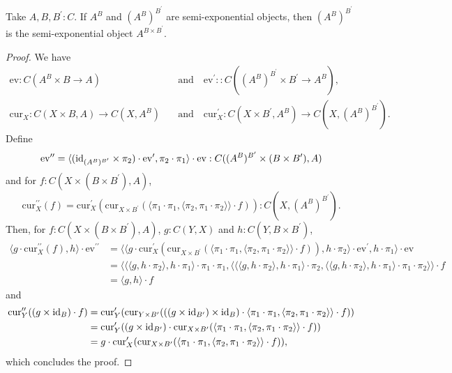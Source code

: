 \begin{lemma}
  Take $ A, B, B^\prime : C $. If $ A^B $ and $ (A^B)^{B^\prime} $ are semi-exponential objects, then $ (A^B)^{B^\prime} $ is the semi-exponential object $ A^{B \times B^\prime} $.
\end{lemma}
\begin{proof}
  We have
  \begin{align*}
    \mathrm{ev} : C(A^B \times B \to A) \quad &\text{and} \quad \mathrm{ev}^\prime : : C((A^B)^{B^\prime} \times B^\prime \to A^B),\\
    \mathrm{cur}_X: C(X \times B, A) \to C(X, A^B) \quad &\text{and} \quad \mathrm{cur}^\prime_X: C(X \times B^\prime, A^B) \to C(X, (A^B)^{B^\prime}).
  \end{align*}
  Define
  \[ \mathrm{ev}^{\prime \prime} = \langle (\text{id}_{(A^B)^{B^\prime}} \times \pi_2) \cdot \mathrm{ev}^\prime, \pi_2 \cdot \pi_1 \rangle \cdot \mathrm{ev} : C((A^B)^{B^\prime} \times (B \times B^\prime), A) \]
  and for $ f: C(X \times (B \times B^\prime), A) $,
  \[ \mathrm{cur}^{\prime \prime}_X(f) = \mathrm{cur}^\prime_X(\mathrm{cur}_{X \times B^\prime}(\langle \pi_1 \cdot \pi_1, \langle \pi_2, \pi_1 \cdot \pi_2 \rangle \rangle \cdot f)) : C(X, (A^B)^{B^\prime}). \]
  Then, for $ f: C(X \times (B \times B^\prime), A) $, $ g: C(Y, X) $ and $ h: C(Y, B \times B^\prime) $,
  \begin{align*}
    \langle g \cdot \mathrm{cur}^{\prime \prime}_X(f), h \rangle \cdot \mathrm{ev}^{\prime \prime}
    &= \langle \langle g \cdot \mathrm{cur}^\prime_X(\mathrm{cur}_{X \times B^\prime}(\langle \pi_1 \cdot \pi_1, \langle \pi_2, \pi_1 \cdot \pi_2 \rangle \rangle \cdot f)), h \cdot \pi_2 \rangle \cdot \mathrm{ev}^\prime, h \cdot \pi_1 \rangle \cdot \mathrm{ev}\\
    &= \langle \langle \langle g, h \cdot \pi_2 \rangle, h \cdot \pi_1 \rangle \cdot \pi_1 \cdot \pi_1, \langle \langle \langle g, h \cdot \pi_2 \rangle, h \cdot \pi_1 \rangle \cdot \pi_2, \langle \langle g, h \cdot \pi_2 \rangle, h \cdot \pi_1 \rangle \cdot \pi_1 \cdot \pi_2 \rangle \rangle \cdot f\\
    &= \langle g, h \rangle \cdot f
  \end{align*}
  and
  \begin{align*}
    \mathrm{cur}^{\prime \prime}_Y((g \times \text{id}_{B}) \cdot f)
    &= \mathrm{cur}^\prime_Y(\mathrm{cur}_{Y \times B^\prime}(((g \times \text{id}_{B^\prime}) \times \text{id}_{B}) \cdot \langle \pi_1 \cdot \pi_1, \langle \pi_2, \pi_1 \cdot \pi_2 \rangle \rangle \cdot f))\\
    &= \mathrm{cur}^\prime_Y((g \times \text{id}_{B^\prime}) \cdot \mathrm{cur}_{X \times B^\prime}(\langle \pi_1 \cdot \pi_1, \langle \pi_2, \pi_1 \cdot \pi_2 \rangle \rangle \cdot f))\\
    &= g \cdot \mathrm{cur}^\prime_X(\mathrm{cur}_{X \times B^\prime}(\langle \pi_1 \cdot \pi_1, \langle \pi_2, \pi_1 \cdot \pi_2 \rangle \rangle \cdot f)),\\
  \end{align*}
  which concludes the proof.
\end{proof}

